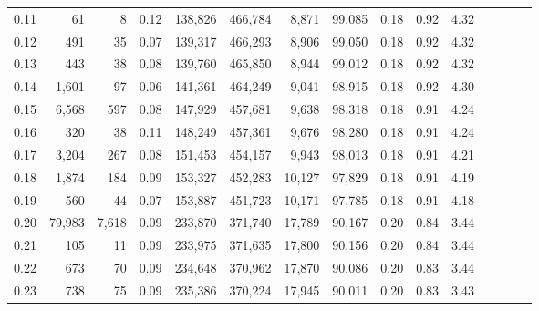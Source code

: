 \begin{tabular}{rrrcrrrrrrrrrrr}
0.11 &      61 &       8 &                                       0.12 &  138,826 &  466,784 &    8,871 &   99,085 &  0.18 &  0.92 &                         4.32 \\
0.12 &     491 &      35 &                                       0.07 &  139,317 &  466,293 &    8,906 &   99,050 &  0.18 &  0.92 &                         4.32 \\
0.13 &     443 &      38 &                                       0.08 &  139,760 &  465,850 &    8,944 &   99,012 &  0.18 &  0.92 &                         4.32 \\
0.14 &   1,601 &      97 &                                       0.06 &  141,361 &  464,249 &    9,041 &   98,915 &  0.18 &  0.92 &                         4.30 \\
0.15 &   6,568 &     597 &                                       0.08 &  147,929 &  457,681 &    9,638 &   98,318 &  0.18 &  0.91 &                         4.24 \\
0.16 &     320 &      38 &                                       0.11 &  148,249 &  457,361 &    9,676 &   98,280 &  0.18 &  0.91 &                         4.24 \\
0.17 &   3,204 &     267 &                                       0.08 &  151,453 &  454,157 &    9,943 &   98,013 &  0.18 &  0.91 &                         4.21 \\
0.18 &   1,874 &     184 &                                       0.09 &  153,327 &  452,283 &   10,127 &   97,829 &  0.18 &  0.91 &                         4.19 \\
0.19 &     560 &      44 &                                       0.07 &  153,887 &  451,723 &   10,171 &   97,785 &  0.18 &  0.91 &                         4.18 \\
0.20 &  79,983 &   7,618 &                                       0.09 &  233,870 &  371,740 &   17,789 &   90,167 &  0.20 &  0.84 &                         3.44 \\
0.21 &     105 &      11 &                                       0.09 &  233,975 &  371,635 &   17,800 &   90,156 &  0.20 &  0.84 &                         3.44 \\
0.22 &     673 &      70 &                                       0.09 &  234,648 &  370,962 &   17,870 &   90,086 &  0.20 &  0.83 &                         3.44 \\
0.23 &     738 &      75 &                                       0.09 &  235,386 &  370,224 &   17,945 &   90,011 &  0.20 &  0.83 &                         3.43 \\

\end{tabular}

